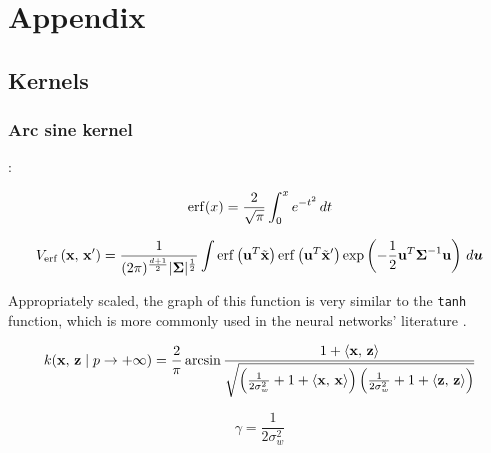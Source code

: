 \chapter{Appendix}
\section{Kernels}
\subsection{Arc sine kernel}

\textcite{frenayParameterinsensitiveKernelExtreme2011,williamsComputationInfiniteNeural1998}:


\begin{equation}
    \operatorname{erf}(x) = \frac{2}{\sqrt{\pi}} \int_0^x e^{-t^2} \,dt
\end{equation}


\begin{equation}
    V_{\operatorname{erf}}\left(\mathbf{x},\,\mathbf{x}'\right) =
    \frac{1}{(2\pi)^{\frac{d+1}{2}} |\boldsymbol \Sigma|^{\frac{1}{2}}}
    \int
    \operatorname{erf} \left(\mathbf{u} ^T \tilde {\mathbf{x}} \right)
    \operatorname{erf} \left(\mathbf{u} ^T \tilde {\mathbf{x}} '\right)
    \exp \left(
    -\frac{1}{2} \mathbf{u} ^T \boldsymbol \Sigma^{-1} \mathbf{u}
    \right)
    \,d\boldsymbol u
\end{equation}

Appropriately scaled, the graph of this function is very similar to the
\texttt{tanh} function, which is more commonly used in the neural networks'
literature \cite{williamsComputationInfiniteNeural1998}.

\begin{equation}
    k(\mathbf{x},\,\mathbf{z} \mid p \to + \infty)  = \frac{2}{\pi}
    \arcsin \frac{1 + \left\langle \mathbf{x},\,\mathbf{z} \right\rangle}{\sqrt{
            \left(
            \frac{1}{2\sigma_w^2} + 1 + \left\langle \mathbf{x},\,\mathbf{x} \right\rangle
            \right)
            \left(
            \frac{1}{2\sigma_w^2} + 1 + \left\langle \mathbf{z},\,\mathbf{z} \right\rangle
            \right)
        }}
\end{equation}

\begin{equation}
    \gamma = \frac{1}{2\sigma_w^2}
\end{equation}

